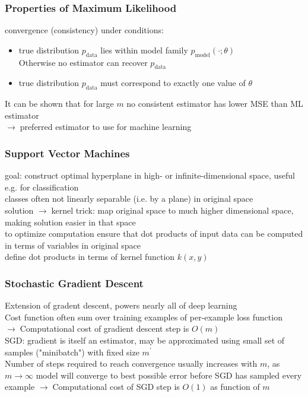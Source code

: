 \documentclass{article}
\newcommand{\arrow}{$\rightarrow\;$}
\newcommand{\p}[1]{p_\text{#1}}
\begin{document}
\subsubsection*{Properties of Maximum Likelihood}
convergence (consistency) under conditions:
\begin{itemize}
    \item true distribution $\p{data}$ lies within model family $\p{model}(\cdot;\theta)$ \\
    Otherwise no estimator can recover $\p{data}$
    \item true distribution $\p{data}$ must correspond to exactly one value of $\theta$
\end{itemize}
It can be shown that for large $m$ no consistent estimator has lower MSE than ML estimator \\
\arrow preferred estimator to use for machine learning


\subsubsection*{Support Vector Machines}
goal: construct optimal hyperplane in high- or infinite-dimensional space, useful e.g. for classification \\
classes often not linearly separable (i.e. by a plane) in original space \\
solution \arrow kernel trick: map original space to much higher dimensional space, making solution easier in that space \\
to optimize computation ensure that dot products of input data can be computed in terms of variables in original space \\
define dot products in terms of kernel function $k(x,y)$

\subsubsection*{Stochastic Gradient Descent}
Extension of gradent descent, powers nearly all of deep learning \\
Cost function often sum over training examples of per-example loss function \\
\arrow Computational cost of gradient descent step is $O(m)$ \\
SGD: gradient is itself an estimator, may be approximated using small set of samples ("minibatch") with fixed size $m^\prime$ \\
Number of steps required to reach convergence usually increases with $m$, as $m \to \infty$ model will converge to best possible error before SGD has sampled every example
\arrow Computational cost of SGD step is $O(1)$ as function of $m$
\end{document}

